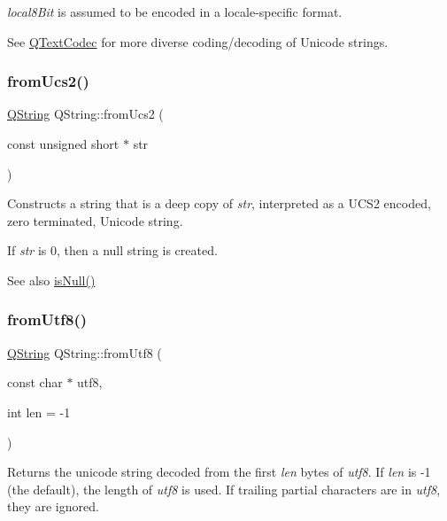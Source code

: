 {\itshape local8\+Bit} is assumed to be encoded in a locale-\/specific format.

See \mbox{\hyperlink{class_q_text_codec}{Q\+Text\+Codec}} for more diverse coding/decoding of Unicode strings. \mbox{\label{class_q_string_acc31424e78107f6f711db5a2b9f7b8f4}} 
\subsubsection{\texorpdfstring{fromUcs2()}{fromUcs2()}}
{\footnotesize\ttfamily \mbox{\hyperlink{class_q_string}{Q\+String}} Q\+String\+::from\+Ucs2 (\begin{DoxyParamCaption}\item[{const unsigned short $\ast$}]{str }\end{DoxyParamCaption})\hspace{0.3cm}{\ttfamily [static]}}

Constructs a string that is a deep copy of {\itshape str}, interpreted as a U\+C\+S2 encoded, zero terminated, Unicode string.

If {\itshape str} is 0, then a null string is created. \begin{DoxySeeAlso}{See also}
\mbox{\hyperlink{class_q_string_a6a6da156364a32ef91e35f83b1955acc}{is\+Null()}} 
\end{DoxySeeAlso}
\mbox{\label{class_q_string_a3e1b40400c137f234bfd2fd73405bca7}} 
\subsubsection{\texorpdfstring{fromUtf8()}{fromUtf8()}}
{\footnotesize\ttfamily \mbox{\hyperlink{class_q_string}{Q\+String}} Q\+String\+::from\+Utf8 (\begin{DoxyParamCaption}\item[{const char $\ast$}]{utf8,  }\item[{int}]{len = {\ttfamily -\/1} }\end{DoxyParamCaption})\hspace{0.3cm}{\ttfamily [static]}}

Returns the unicode string decoded from the first {\itshape len} bytes of {\itshape utf8}. If {\itshape len} is -\/1 (the default), the length of {\itshape utf8} is used. If trailing partial characters are in {\itshape utf8}, they are ignored.

